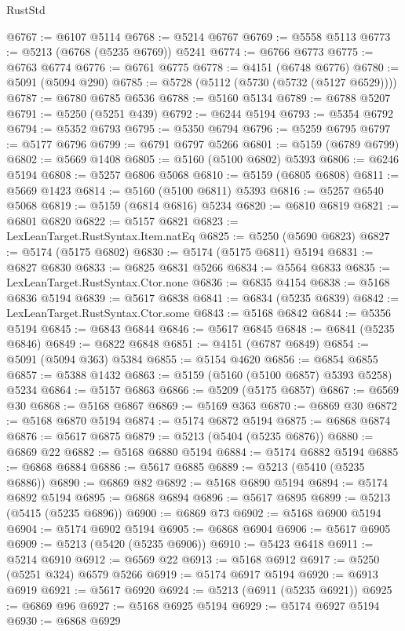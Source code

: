 \begin{lexlean}{RustStd}
\begin{coremodule}
@6767 := @6107 @5114
@6768 := @5214 @6767
@6769 := @5558 @5113
@6773 := @5213 (@6768 (@5235 @6769)) @5241
@6774 := @6766 @6773
@6775 := @6763 @6774
@6776 := @6761 @6775
@6778 := @4151 (@6748 @6776)
@6780 := @5091 (@5094 @290)
@6785 := @5728 (@5112 (@5730 (@5732 (@5127 @6529))))
@6787 := @6780 @6785 @6536
@6788 := @5160 @5134
@6789 := @6788 @5207
@6791 := @5250 (@5251 @439)
@6792 := @6244 @5194
@6793 := @5354 @6792
@6794 := @5352 @6793
@6795 := @5350 @6794
@6796 := @5259 @6795
@6797 := @5177 @6796
@6799 := @6791 @6797 @5266
@6801 := @5159 (@6789 @6799)
@6802 := @5669 @1408
@6805 := @5160 (@5100 @6802) @5393
@6806 := @6246 @5194
@6808 := @5257 @6806 @5068
@6810 := @5159 (@6805 @6808)
@6811 := @5669 @1423
@6814 := @5160 (@5100 @6811) @5393
@6816 := @5257 @6540 @5068
@6819 := @5159 (@6814 @6816) @5234
@6820 := @6810 @6819
@6821 := @6801 @6820
@6822 := @5157 @6821
@6823 := LexLeanTarget.RustSyntax.Item.natEq
@6825 := @5250 (@5690 @6823)
@6827 := @5174 (@5175 @6802)
@6830 := @5174 (@5175 @6811) @5194
@6831 := @6827 @6830
@6833 := @6825 @6831 @5266
@6834 := @5564 @6833
@6835 := LexLeanTarget.RustSyntax.Ctor.none
@6836 := @6835 @4154
@6838 := @5168 @6836 @5194
@6839 := @5617 @6838
@6841 := @6834 (@5235 @6839)
@6842 := LexLeanTarget.RustSyntax.Ctor.some
@6843 := @5168 @6842
@6844 := @5356 @5194
@6845 := @6843 @6844
@6846 := @5617 @6845
@6848 := @6841 (@5235 @6846)
@6849 := @6822 @6848
@6851 := @4151 (@6787 @6849)
@6854 := @5091 (@5094 @363) @5384
@6855 := @5154 @4620
@6856 := @6854 @6855
@6857 := @5388 @1432
@6863 := @5159 (@5160 (@5100 @6857) @5393 @5258) @5234
@6864 := @5157 @6863
@6866 := @5209 (@5175 @6857)
@6867 := @6569 @30
@6868 := @5168 @6867
@6869 := @5169 @363
@6870 := @6869 @30
@6872 := @5168 @6870 @5194
@6874 := @5174 @6872 @5194
@6875 := @6868 @6874
@6876 := @5617 @6875
@6879 := @5213 (@5404 (@5235 @6876))
@6880 := @6869 @22
@6882 := @5168 @6880 @5194
@6884 := @5174 @6882 @5194
@6885 := @6868 @6884
@6886 := @5617 @6885
@6889 := @5213 (@5410 (@5235 @6886))
@6890 := @6869 @82
@6892 := @5168 @6890 @5194
@6894 := @5174 @6892 @5194
@6895 := @6868 @6894
@6896 := @5617 @6895
@6899 := @5213 (@5415 (@5235 @6896))
@6900 := @6869 @73
@6902 := @5168 @6900 @5194
@6904 := @5174 @6902 @5194
@6905 := @6868 @6904
@6906 := @5617 @6905
@6909 := @5213 (@5420 (@5235 @6906))
@6910 := @5423 @6418
@6911 := @5214 @6910
@6912 := @6569 @22
@6913 := @5168 @6912
@6917 := @5250 (@5251 @324) @6579 @5266
@6919 := @5174 @6917 @5194
@6920 := @6913 @6919
@6921 := @5617 @6920
@6924 := @5213 (@6911 (@5235 @6921))
@6925 := @6869 @96
@6927 := @5168 @6925 @5194
@6929 := @5174 @6927 @5194
@6930 := @6868 @6929

\end{coremodule}
\end{lexlean}
